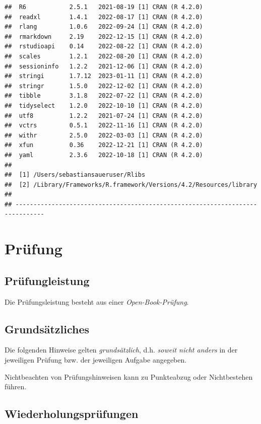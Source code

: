 \documentclass[
  a4paper,
  DIV=11]{scrreprt}
\theoremstyle{definition}
\theoremstyle{remark}
\begin{document}
\begin{verbatim}
##  R6            2.5.1   2021-08-19 [1] CRAN (R 4.2.0)
##  readxl        1.4.1   2022-08-17 [1] CRAN (R 4.2.0)
##  rlang         1.0.6   2022-09-24 [1] CRAN (R 4.2.0)
##  rmarkdown     2.19    2022-12-15 [1] CRAN (R 4.2.0)
##  rstudioapi    0.14    2022-08-22 [1] CRAN (R 4.2.0)
##  scales        1.2.1   2022-08-20 [1] CRAN (R 4.2.0)
##  sessioninfo   1.2.2   2021-12-06 [1] CRAN (R 4.2.0)
##  stringi       1.7.12  2023-01-11 [1] CRAN (R 4.2.0)
##  stringr       1.5.0   2022-12-02 [1] CRAN (R 4.2.0)
##  tibble        3.1.8   2022-07-22 [1] CRAN (R 4.2.0)
##  tidyselect    1.2.0   2022-10-10 [1] CRAN (R 4.2.0)
##  utf8          1.2.2   2021-07-24 [1] CRAN (R 4.2.0)
##  vctrs         0.5.1   2022-11-16 [1] CRAN (R 4.2.0)
##  withr         2.5.0   2022-03-03 [1] CRAN (R 4.2.0)
##  xfun          0.36    2022-12-21 [1] CRAN (R 4.2.0)
##  yaml          2.3.6   2022-10-18 [1] CRAN (R 4.2.0)
## 
##  [1] /Users/sebastiansaueruser/Rlibs
##  [2] /Library/Frameworks/R.framework/Versions/4.2/Resources/library
## 
## ------------------------------------------------------------------------------
\end{verbatim}


\hypertarget{pruxfcfung}{%
\chapter{Prüfung}\label{pruxfcfung}}

\hypertarget{pruxfcfungleistung}{%
\section{Prüfungleistung}\label{pruxfcfungleistung}}

Die Prüfungsleistung besteht aus einer \emph{Open-Book-Prüfung}.

\hypertarget{grundsuxe4tzliches}{%
\section{Grundsätzliches}\label{grundsuxe4tzliches}}

Die folgenden Hinweise gelten \emph{grundsätzlich}, d.h. \emph{soweit
nicht anders} in der jeweiligen Prüfung bzw. der jeweiligen Aufgabe
angegeben.

Nichtbeachten von Prüfungshinweisen kann zu Punkteabzug oder
Nichtbestehen führen.

\hypertarget{wiederholungspruxfcfungen}{%
\section{Wiederholungsprüfungen}\label{wiederholungspruxfcfungen}}
\end{document}
